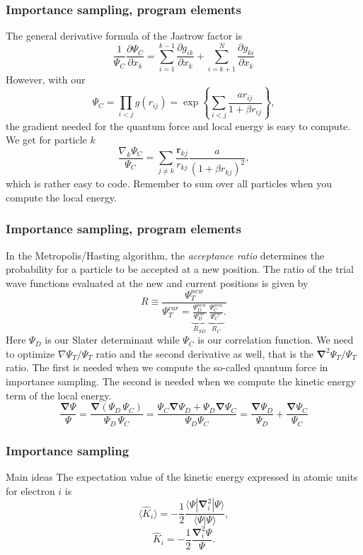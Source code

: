 \documentclass{beamer}
\begin{document}
\begin{frame}
\frametitle{Importance sampling, program elements}

\begin{block}{}
The general derivative formula of the Jastrow factor is
\[
\frac{1}{\Psi_C}\frac{\partial \Psi_C}{\partial x_k} =
\sum_{i=1}^{k-1}\frac{\partial g_{ik}}{\partial x_k}
+
\sum_{i=k+1}^{N}\frac{\partial g_{ki}}{\partial x_k}
\]
However, 
with our
\[
\Psi_C=\prod_{i< j}g(r_{ij})= \exp{\left\{\sum_{i<j}\frac{ar_{ij}}{1+\beta r_{ij}}\right\}},
\]
the gradient needed for the quantum force and local energy is easy to compute.  
We get for particle  $k$
\[
\frac{ \nabla_k \Psi_C}{ \Psi_C }= \sum_{j\ne k}\frac{\mathbf{r}_{kj}}{r_{kj}}\frac{a}{(1+\beta r_{kj})^2},
\]
which is rather easy to code.  Remember to sum over all particles  when you compute the local energy.

\end{block}
\end{frame}

\begin{frame}
\frametitle{Importance sampling, program elements}

\begin{block}{}
In the Metropolis/Hasting algorithm, the \emph{acceptance ratio} determines the probability for a particle  to be accepted at a new position. The ratio of the trial wave functions evaluated at the new and current positions is given by
\[
R \equiv \frac{\Psi_{T}^{new}}{\Psi_{T}^{cur} = \underbrace{\frac{\Psi_{D}^{new}}{\Psi_{D}^{cur}}}_{R_{SD}}\, \underbrace{\frac{\Psi_{C}^{new}}{\Psi_{C}^{cur}}}_{R_{C}}.}
\]
Here $\Psi_{D}$ is our Slater determinant while $\Psi_{C}$ is our correlation function. 
We need to optimize $\nabla \Psi_T / \Psi_T$ ratio and the second derivative as well, that is
the $\mathbf{\nabla}^2 \Psi_T/\Psi_T$ ratio. The first is needed when we compute the so-called quantum force in importance sampling.
The second is needed when we compute the kinetic energy term of the local energy.
\[
\frac{\mathbf{\mathbf{\nabla}}  \Psi}{\Psi}  = \frac{\mathbf{\nabla}  (\Psi_{D} \, \Psi_{C})}{\Psi_{D} \, \Psi_{C}}  =  \frac{ \Psi_C \mathbf{\nabla}  \Psi_{D} + \Psi_{D} \mathbf{\nabla}  \Psi_{C}}{\Psi_{D} \Psi_{C}} = \frac{\mathbf{\nabla}  \Psi_{D}}{\Psi_{D}} + \frac{\mathbf{\nabla}   \Psi_C}{ \Psi_C}
\]
\end{block}
\end{frame}

\begin{frame}
\frametitle{Importance sampling}

\begin{block}{Main ideas }
The expectation value of the kinetic energy expressed in atomic units for electron $i$ is 
\[
 \langle \hat{K}_i \rangle = -\frac{1}{2}\frac{\langle\Psi|\mathbf{\nabla}_{i}^2|\Psi \rangle}{\langle\Psi|\Psi \rangle},
\]
\[
\hat{K}_i = -\frac{1}{2}\frac{\mathbf{\nabla}_{i}^{2} \Psi}{\Psi}.
\]

\end{block}
\end{frame}
\end{document}
